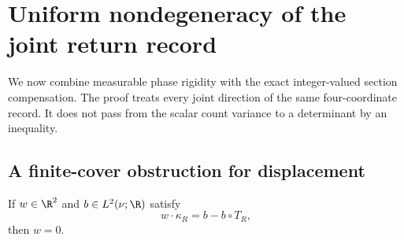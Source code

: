 \section{Uniform nondegeneracy of the joint return record}
\label{sec:joint-nondegeneracy}
We now combine measurable phase rigidity with the exact integer-valued
section compensation. The proof treats every joint direction of the
same four-coordinate record. It does not pass from the scalar count
variance to a determinant by an inequality.

\subsection{A finite-cover obstruction for displacement}
\begin{lemma}
\label{lem:no-spatial-coboundary}
If $w\in\R^2$ and $b\in L^2(\nu;\R)$ satisfy
\begin{equation}\label{eq:spatial-coboundary}
 w\cdot\kappa_R=b-b\circ T_R,
\end{equation}
then $w=0$.
\end{lemma}
